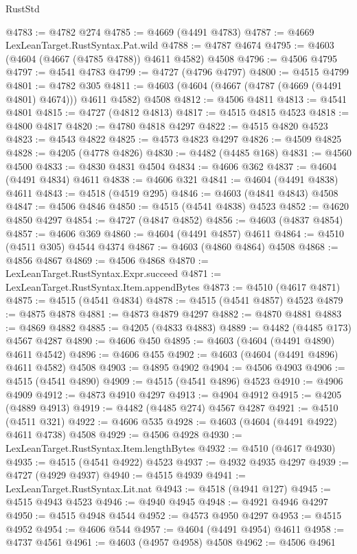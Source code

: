 \begin{lexlean}{RustStd}
\begin{coremodule}
@4783 := @4782 @274
@4785 := @4669 (@4491 @4783)
@4787 := @4669 LexLeanTarget.RustSyntax.Pat.wild
@4788 := @4787 @4674
@4795 := @4603 (@4604 (@4667 (@4785 @4788)) @4611 @4582) @4508
@4796 := @4506 @4795
@4797 := @4541 @4783
@4799 := @4727 (@4796 @4797)
@4800 := @4515 @4799
@4801 := @4782 @305
@4811 := @4603 (@4604 (@4667 (@4787 (@4669 (@4491 @4801) @4674))) @4611 @4582) @4508
@4812 := @4506 @4811
@4813 := @4541 @4801
@4815 := @4727 (@4812 @4813)
@4817 := @4515 @4815 @4523
@4818 := @4800 @4817
@4820 := @4780 @4818 @4297
@4822 := @4515 @4820 @4523
@4823 := @4543 @4822
@4825 := @4573 @4823 @4297
@4826 := @4509 @4825
@4828 := @4205 (@4778 @4826)
@4830 := @4482 (@4485 @168)
@4831 := @4560 @4500
@4833 := @4830 @4831 @4504
@4834 := @4606 @362
@4837 := @4604 (@4491 @4834) @4611
@4838 := @4606 @321
@4841 := @4604 (@4491 @4838) @4611
@4843 := @4518 (@4519 @295)
@4846 := @4603 (@4841 @4843) @4508
@4847 := @4506 @4846
@4850 := @4515 (@4541 @4838) @4523
@4852 := @4620 @4850 @4297
@4854 := @4727 (@4847 @4852)
@4856 := @4603 (@4837 @4854)
@4857 := @4606 @369
@4860 := @4604 (@4491 @4857) @4611
@4864 := @4510 (@4511 @305) @4544 @4374
@4867 := @4603 (@4860 @4864) @4508
@4868 := @4856 @4867
@4869 := @4506 @4868
@4870 := LexLeanTarget.RustSyntax.Expr.succeed
@4871 := LexLeanTarget.RustSyntax.Item.appendBytes
@4873 := @4510 (@4617 @4871)
@4875 := @4515 (@4541 @4834)
@4878 := @4515 (@4541 @4857) @4523
@4879 := @4875 @4878
@4881 := @4873 @4879 @4297
@4882 := @4870 @4881
@4883 := @4869 @4882
@4885 := @4205 (@4833 @4883)
@4889 := @4482 (@4485 @173) @4567 @4287
@4890 := @4606 @450
@4895 := @4603 (@4604 (@4491 @4890) @4611 @4542)
@4896 := @4606 @455
@4902 := @4603 (@4604 (@4491 @4896) @4611 @4582) @4508
@4903 := @4895 @4902
@4904 := @4506 @4903
@4906 := @4515 (@4541 @4890)
@4909 := @4515 (@4541 @4896) @4523
@4910 := @4906 @4909
@4912 := @4873 @4910 @4297
@4913 := @4904 @4912
@4915 := @4205 (@4889 @4913)
@4919 := @4482 (@4485 @274) @4567 @4287
@4921 := @4510 (@4511 @321)
@4922 := @4606 @535
@4928 := @4603 (@4604 (@4491 @4922) @4611 @4738) @4508
@4929 := @4506 @4928
@4930 := LexLeanTarget.RustSyntax.Item.lengthBytes
@4932 := @4510 (@4617 @4930)
@4935 := @4515 (@4541 @4922) @4523
@4937 := @4932 @4935 @4297
@4939 := @4727 (@4929 @4937)
@4940 := @4515 @4939
@4941 := LexLeanTarget.RustSyntax.Lit.nat
@4943 := @4518 (@4941 @127)
@4945 := @4515 @4943 @4523
@4946 := @4940 @4945
@4948 := @4921 @4946 @4297
@4950 := @4515 @4948 @4544
@4952 := @4573 @4950 @4297
@4953 := @4515 @4952
@4954 := @4606 @544
@4957 := @4604 (@4491 @4954) @4611
@4958 := @4737 @4561
@4961 := @4603 (@4957 @4958) @4508
@4962 := @4506 @4961

\end{coremodule}
\end{lexlean}

